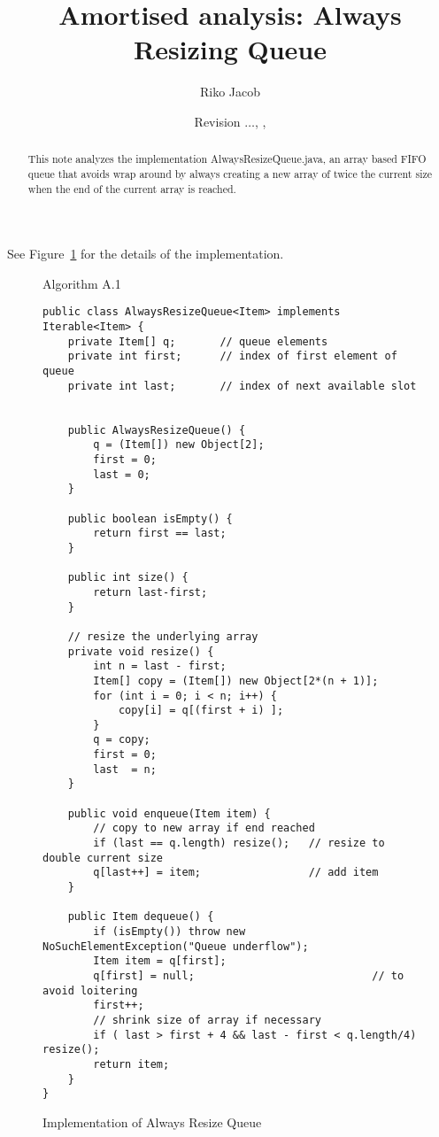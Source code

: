 \documentclass{tufte-handout}
\title{Amortised analysis: Always Resizing Queue}
\author{Riko Jacob}
\date{\small Revision {\tt \GITAbrHash}$\ldots$, \GITAuthorDate, \GITAuthorName}
\begin{document}
\maketitle

\begin{abstract}
  This note analyzes the implementation AlwaysResizeQueue.java,
  an array based FIFO queue that avoids wrap around by always creating a new array of twice the current size when the end of the current array is reached.
\end{abstract}

See Figure~\ref{fig:impl} for the details of the implementation.

\begin{figure}

Algorithm A.1 

\small
\begin{lstlisting}[basicstyle=\ttfamily,backgroundcolor=\color{white},
  frame=single,rulecolor=\color{gray!20},framesep=10pt, linewidth=12cm]
public class AlwaysResizeQueue<Item> implements Iterable<Item> {
    private Item[] q;       // queue elements
    private int first;      // index of first element of queue
    private int last;       // index of next available slot


    public AlwaysResizeQueue() {
        q = (Item[]) new Object[2];
        first = 0;
        last = 0;
    }

    public boolean isEmpty() {
        return first == last;
    }

    public int size() {
        return last-first;
    }

    // resize the underlying array
    private void resize() {
        int n = last - first;
        Item[] copy = (Item[]) new Object[2*(n + 1)];
        for (int i = 0; i < n; i++) {
            copy[i] = q[(first + i) ];
        }
        q = copy;
        first = 0;
        last  = n;
    }

    public void enqueue(Item item) {
        // copy to new array if end reached
        if (last == q.length) resize();   // resize to double current size
        q[last++] = item;                 // add item
    }

    public Item dequeue() {
        if (isEmpty()) throw new NoSuchElementException("Queue underflow");
        Item item = q[first];
        q[first] = null;                            // to avoid loitering
        first++;
        // shrink size of array if necessary
        if ( last > first + 4 && last - first < q.length/4) resize(); 
        return item;
    }
}
\end{lstlisting}
\caption{\label{fig:impl}Implementation of Always Resize Queue}
\end{figure}
\end{document}
